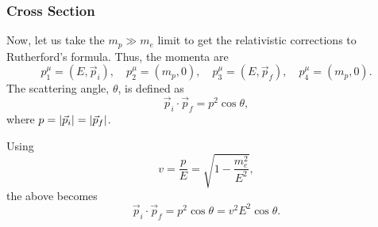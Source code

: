 \documentclass[11pt]{article}
\theoremstyle{definition}
\begin{document}
\subsubsection{Cross Section}
Now, let us take the $m_p \gg m_e$ limit to get the relativistic corrections to Rutherford's formula. Thus, the momenta are
\begin{equation}
    p_1^\mu = (E, \vec{p}_i), \quad p_2^\mu = (m_p,0), \quad p_3^\mu=(E, \vec{p}_f), \quad p_4^\mu=(m_p,0).
\end{equation}
The scattering angle, $\theta$, is defined as
\begin{equation}
    \vec{p}_i\cdot\vec{p}_f = p^2\cos\theta,
\end{equation}
where $p = \abs{\vec{p}_i} =\abs{\vec{p}_f}$. 

Using 
\begin{equation}
    v = \frac{p}{E} = \sqrt{1-\frac{m_e^2}{E^2}},
\end{equation}
the above becomes
\begin{equation}
    \vec{p}_i\cdot\vec{p}_f = p^2\cos\theta = v^2E^2\cos\theta.
\end{equation}
\end{document}

